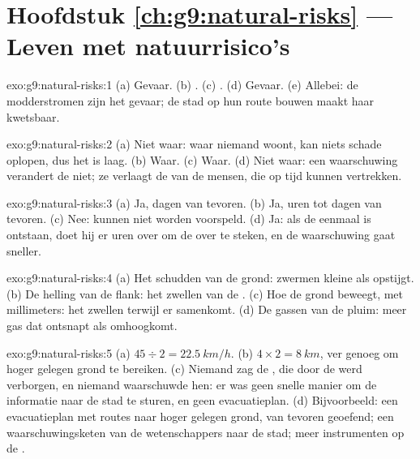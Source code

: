 \section*{Hoofdstuk \ref{ch:g9:natural-risks} --- Leven met natuurrisico's}

\begin{solution}{exo:g9:natural-risks:1}
(a) Gevaar. (b) . (c) . (d) Gevaar. (e) Allebei:
de modderstromen zijn het gevaar; de stad op hun route bouwen maakt haar
kwetsbaar.
\end{solution}

\begin{solution}{exo:g9:natural-risks:2}
(a) Niet waar: waar niemand woont, kan niets schade oplopen, dus het 
is laag. (b) Waar. (c) Waar. (d) Niet waar: een waarschuwing verandert de
 niet; ze verlaagt de  van de mensen, die op tijd
kunnen vertrekken.
\end{solution}

\begin{solution}{exo:g9:natural-risks:3}
(a) Ja, dagen van tevoren. (b) Ja, uren tot dagen van tevoren. (c) Nee:
 kunnen niet worden voorspeld. (d) Ja: als de  eenmaal
is ontstaan, doet hij er uren over om de  over te steken, en de
waarschuwing gaat sneller.
\end{solution}

\begin{solution}{exo:g9:natural-risks:4}
(a) Het schudden van de grond: zwermen kleine  als 
opstijgt. (b) De helling van de flank: het zwellen van de . (c) Hoe
de grond beweegt, met millimeters: het zwellen terwijl er  samenkomt.
(d) De gassen van de pluim: meer gas dat ontsnapt als  omhoogkomt.
\end{solution}

\begin{solution}{exo:g9:natural-risks:5}
(a) $45 \div 2 = \qty{22.5}{km/h}$. (b) $4 \times 2 = \qty{8}{km}$, ver
genoeg om hoger gelegen grond te bereiken. (c) Niemand zag de
, die door de  werd verborgen, en niemand waarschuwde hen:
er was geen snelle manier om de informatie naar de stad te sturen, en geen
evacuatieplan. (d) Bijvoorbeeld: een evacuatieplan met routes naar hoger
gelegen grond, van tevoren geoefend; een waarschuwingsketen van de
wetenschappers naar de stad; meer instrumenten op de .
\end{solution}

